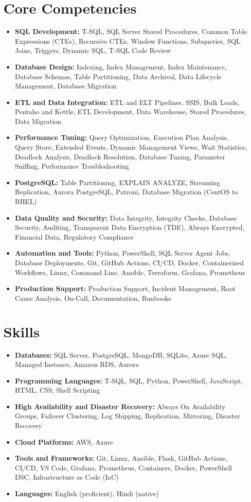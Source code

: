 \documentclass[10pt,a4paper]{article}
\begin{document}
\section{Core Competencies}
\begin{itemize}
  \item \textbf{SQL Development:} T-SQL, SQL Server Stored Procedures, Common Table Expressions (CTEs), Recursive CTEs, Window Functions, Subqueries, SQL Joins, Triggers, Dynamic SQL, T-SQL Code Review
  \item \textbf{Database Design:} Indexing, Index Management, Index Maintenance, Database Schemas, Table Partitioning, Data Archival, Data Lifecycle Management, Database Migration
  \item \textbf{ETL and Data Integration:} ETL and ELT Pipelines, SSIS, Bulk Loads, Pentaho and Kettle, ETL Development, Data Warehouse, Stored Procedures, Data Migration
  \item \textbf{Performance Tuning:} Query Optimization, Execution Plan Analysis, Query Store, Extended Events, Dynamic Management Views, Wait Statistics, Deadlock Analysis, Deadlock Resolution, Database Tuning, Parameter Sniffing, Performance Troubleshooting
  \item \textbf{PostgreSQL:} Table Partitioning, EXPLAIN ANALYZE, Streaming Replication, Aurora PostgreSQL, Patroni, Database Migration (CentOS to RHEL)
  \item \textbf{Data Quality and Security:} Data Integrity, Integrity Checks, Database Security, Auditing, Transparent Data Encryption (TDE), Always Encrypted, Financial Data, Regulatory Compliance
  \item \textbf{Automation and Tools:} Python, PowerShell, SQL Server Agent Jobs, Database Deployments, Git, GitHub Actions, CI/CD, Docker, Containerized Workflows, Linux, Command Line, Ansible, Terraform, Grafana, Prometheus
  \item \textbf{Production Support:} Production Support, Incident Management, Root Cause Analysis, On-Call, Documentation, Runbooks
\end{itemize}
\section{Skills}
\begin{itemize}
  \item \textbf{Databases:} SQL Server, PostgreSQL, MongoDB, SQLite, Azure SQL, Managed Instance, Amazon RDS, Aurora
  \item \textbf{Programming Languages:} T-SQL, SQL, Python, PowerShell, JavaScript, HTML, CSS, Shell Scripting
  \item \textbf{High Availability and Disaster Recovery:} Always On Availability Groups, Failover Clustering, Log Shipping, Replication, Mirroring, Disaster Recovery
  \item \textbf{Cloud Platforms:} AWS, Azure
  \item \textbf{Tools and Frameworks:} Git, Linux, Ansible, Flask, GitHub Actions, CI/CD, VS Code, Grafana, Prometheus, Containers, Docker, PowerShell DSC, Infrastructure as Code (IaC)
  \item \textbf{Languages:} English (proficient), Hindi (native)
\end{itemize}
\end{document}
